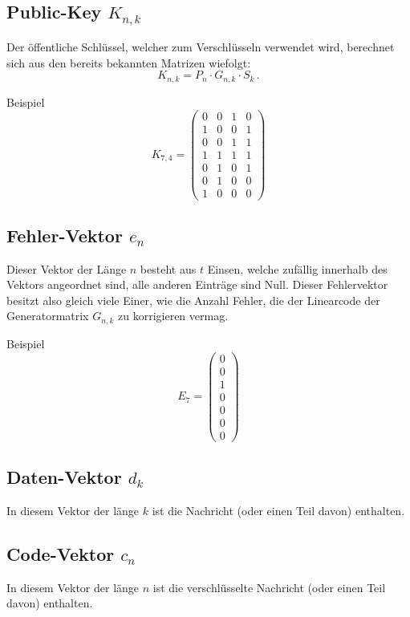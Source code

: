 \subsection{Public-Key $K_{n,k}$
\label{mceliece:subsection:k_nk}}
Der öffentliche Schlüssel, welcher zum Verschlüsseln verwendet wird,
berechnet sich aus den bereits bekannten Matrizen wiefolgt:
\[
    K_{n,k}=P_{n}\cdot G_{n,k}\cdot S_{k}\,.
\]

Beispiel
\[
    K_{7,4}=
    \begin{pmatrix}
        0 & 0 & 1 & 0\\
        1 & 0 & 0 & 1\\
        0 & 0 & 1 & 1\\
        1 & 1 & 1 & 1\\
        0 & 1 & 0 & 1\\
        0 & 1 & 0 & 0\\
        1 & 0 & 0 & 0
    \end{pmatrix}
\]

\subsection{Fehler-Vektor $e_n$
\label{mceliece:subsection:e_n}}
Dieser Vektor der Länge $n$ besteht aus $t$ Einsen, welche zufällig innerhalb des Vektors angeordnet sind,
alle anderen Einträge sind Null.
Dieser Fehlervektor besitzt also gleich viele Einer,
wie die Anzahl Fehler, die der Linearcode der Generatormatrix $G_{n,k}$ zu korrigieren vermag.

Beispiel
\[
    E_7=
    \begin{pmatrix}
        0\\
        0\\
        1\\
        0\\
        0\\
        0\\
        0
    \end{pmatrix}
\]

\subsection{Daten-Vektor $d_k$
\label{mceliece:subsection:d_k}}
In diesem Vektor der länge $k$ ist die Nachricht (oder einen Teil davon) enthalten.

\subsection{Code-Vektor $c_n$
\label{mceliece:subsection:c_n}}
In diesem Vektor der länge $n$ ist die verschlüsselte Nachricht (oder einen Teil davon) enthalten.